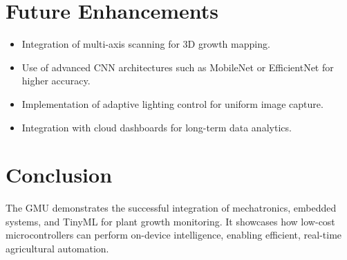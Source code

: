 \documentclass[../main]{subfiles}
\begin{document}
\section{Future Enhancements}
\begin{itemize}
    \item Integration of multi-axis scanning for 3D growth mapping.
    \item Use of advanced CNN architectures such as MobileNet or EfficientNet for higher accuracy.
    \item Implementation of adaptive lighting control for uniform image capture.
    \item Integration with cloud dashboards for long-term data analytics.
\end{itemize}

\section{Conclusion}
The GMU demonstrates the successful integration of mechatronics, embedded systems, and TinyML for plant growth monitoring. It showcases how low-cost microcontrollers can perform on-device intelligence, enabling efficient, real-time agricultural automation.
\end{document}
